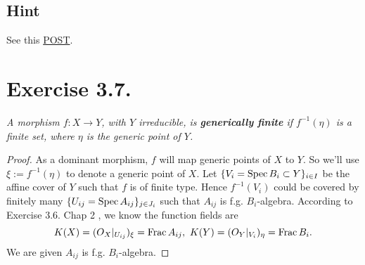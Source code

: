 \subsection{Hint}

See this \href{https://math.stackexchange.com/questions/218767/relation-of-function-field-of-a-scheme-to-the-local-ring-of-its-prime-divisor}{POST}.

\section{Exercise 3.7.}

\textit{A morphism $f:X\to Y$, with $Y$ irreducible, is \textbf{generically finite } if $f^{-1}(\eta)$ is a finite set, where $\eta$ is the generic point of $Y$.}

\begin{proof}
    
    As a dominant morphism, $f$ will map generic points of $X$ to $Y$. So we'll use $\xi:=f^{-1}(\eta)$ to denote a generic point of $X$. Let $\{V_i=\operatorname{Spec} B_i\subset Y\}_{i\in I}$ be the affine cover of  $Y$ such that $f$ is of finite type. Hence $f^{-1}(V_i)$ could be covered by finitely many $\{U_{ij}=\operatorname{Spec} A_{ij}\}_{j\in J_i}$ such that $A_{ij}$ is f.g. $B_i$-algebra. According to Exercise 3.6. Chap 2 \cite{hartshorne2013algebraic}, we know the function fields are 
    \[K(X)=\mathcal (O_X\vert_{U_{ij}})_{\xi}=\operatorname{Frac} A_{ij},~ K(Y)=\mathcal (O_Y\vert_{V_i})_{\eta}=\operatorname{Frac} B_i.\]
    We are given $A_{ij}$ is f.g. $B_i$-algebra. 

\end{proof}
